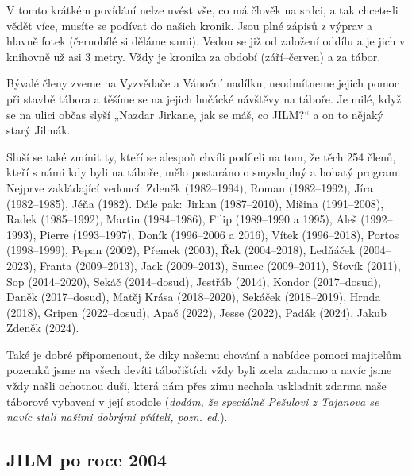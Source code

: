 V tomto krátkém povídání nelze uvést vše, co má člověk na srdci, a tak
chcete-li vědět více, musíte se podívat do našich kronik. Jsou plné
zápisů z výprav a hlavně fotek (černobílé si děláme sami). Vedou se již
od založení oddílu a je jich v knihovně už asi 3 metry. Vždy je kronika
za období (září--červen) a za tábor.

Bývalé členy zveme na Vyzvědače a Vánoční nadílku, neodmítneme jejich
pomoc při stavbě tábora a těšíme se na jejich hučácké návštěvy na
táboře. Je milé, když se na ulici občas slyší „Nazdar Jirkane, jak se
máš, co JILM?{}`` a on to nějaký starý Jilmák.

Sluší se také zmínit ty, kteří se alespoň chvíli podíleli na tom, že
těch 254 členů, kteří s námi kdy byli na táboře, mělo postaráno o
smysluplný a bohatý program. Nejprve zakládající vedoucí: Zdeněk
(1982--1994), Roman (1982--1992), Jíra (1982--1985), Jéňa (1982). Dále
pak: Jirkan (1987--2010), Mišina (1991--2008), Radek (1985--1992),
Martin (1984--1986), Filip (1989--1990 a 1995), Aleš (1992--1993),
Pierre (1993--1997), Doník (1996--2006 a 2016), Vítek (1996--2018),
Portos (1998--1999), Pepan (2002), Přemek (2003), Řek (2004--2018),
Ledňáček (2004--2023), Franta (2009--2013), Jack (2009--2013), Sumec
(2009--2011), Šťovík (2011), Sop (2014--2020), Sekáč (2014--dosud),
Jestřáb (2014), Kondor (2017--dosud), Daněk (2017--dosud), Matěj Krása
(2018--2020), Sekáček (2018--2019), Hrnda (2018), Gripen (2022--dosud),
Apač (2022), Jesse (2022), Padák (2024), Jakub Zdeněk (2024).

Také je dobré připomenout, že díky našemu chování a nabídce pomoci
majitelům pozemků jsme na všech devíti tábořištích vždy byli zcela
zadarmo a navíc jsme vždy našli ochotnou duši, která nám přes zimu
nechala uskladnit zdarma naše táborové vybavení v její stodole
(\emph{dodám, že speciálně Pešulovi z Tajanova se navíc stali našimi
dobrými přáteli, pozn. ed.}).

\subsection{JILM po roce 2004}\label{jilm-po-roce-2004}

